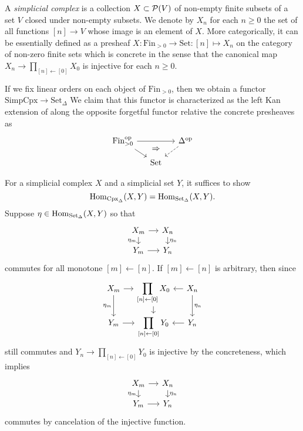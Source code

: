 \documentclass{../../large}
\begin{document}
\begin{prb}
A \emph{simplicial complex} is a collection $X\subset\mathcal{P}(V)$ of non-empty finite subsets of a set $V$ closed under non-empty subsets.
We denote by $X_n$ for each $n\ge0$ the set of all functions $[n]\to V$ whose image is an element of $X$.
More categorically, it can be essentially defined as a presheaf $X:\mathrm{Fin}_{>0}\to\mathrm{Set}:[n]\mapsto X_n$ on the category of non-zero finite sets which is concrete in the sense that the canonical map $X_n\to\prod_{[n]\leftarrow[0]}X_0$ is injective for each $n\ge0$.

If we fix linear orders on each object of $\mathrm{Fin}_{>0}$, then we obtain a functor $\mathrm{SimpCpx}\to\mathrm{Set}_\Delta$
We claim that this functor is characterized as the left Kan extension of along the opposite forgetful functor relative the concrete presheaves as
\[\begin{tikzcd}[sep=small]
\mathrm{Fin}_{>0}^\op \ar{rr}\ar{dr}\ar[shift right=4,phantom]{rr}{\Rightarrow} && \Delta^\op \ar[dashed]{dl} \\
& \mathrm{Set} &
\end{tikzcd}\]

For a simplicial complex $X$ and a simplicial set $Y$, it suffices to show
\[\operatorname{Hom}_{\mathrm{Cpx}_\Delta}(X,Y)=\operatorname{Hom}_{\mathrm{Set}_\Delta}(X,Y).\]
Suppose $\eta\in\operatorname{Hom}_{\mathrm{Set}_\Delta}(X,Y)$ so that
\[\begin{tikzcd}[sep=small]
X_m \dar[swap]{\eta_m}\rar & X_n \dar{\eta_n} \\
Y_m \rar & Y_n
\end{tikzcd}\]
commutes for all monotone $[m]\leftarrow[n]$.
If $[m]\leftarrow[n]$ is arbitrary, then since
\[\begin{tikzcd}[sep=small]
X_m \dar[swap]{\eta_m}\rar & \displaystyle\prod_{[n]\leftarrow[0]}X_0 \dar & X_n \dar{\eta_n}\lar \\
Y_m \rar & \displaystyle\prod_{[n]\leftarrow[0]}Y_0 & Y_n \lar
\end{tikzcd}\]
still commutes and $Y_n\to\prod_{[n]\leftarrow[0]}Y_0$ is injective by the concreteness, which implies
\[\begin{tikzcd}[sep=small]
X_m \dar[swap]{\eta_m}\rar & X_n \dar{\eta_n} \\
Y_m \rar & Y_n
\end{tikzcd}\]
commutes by cancelation of the injective function.

\end{prb}
\end{document}
